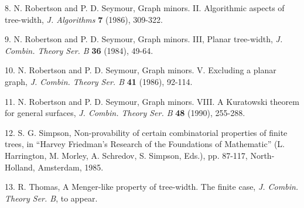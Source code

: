 8. N. Robertson and P. D. Seymour, Graph minors. II. Algorithmic aspects of tree-width, \textit{J. Algorithms} \textbf{7} (1986), 309-322.

9. N. Robertson and P. D. Seymour, Graph minors. III, Planar tree-width, \textit{J. Combin. Theory Ser. B} \textbf{36} (1984), 49-64.

10. N. Robertson and P. D. Seymour, Graph minors. V. Excluding a planar graph, \textit{J. Combin. Theory Ser. B} \textbf{41} (1986), 92-114.

11. N. Robertson and P. D. Seymour, Graph minors. VIII. A Kuratowski theorem for general surfaces, \textit{J. Combin. Theory Ser. B} \textbf{48} (1990), 255-288.

12. S. G. Simpson, Non-provability of certain combinatorial properties of finite trees, in ``Harvey Friedman's Research of the Foundations of Mathematic'' (L. Harrington, M. Morley, A. Schredov, S. Simpson, Eds.), pp. 87-117, North-Holland, Amsterdam, 1985.

13. R. Thomas, A Menger-like property of tree-width. The finite case, \textit{J. Combin. Theory Ser. B}, to appear.
